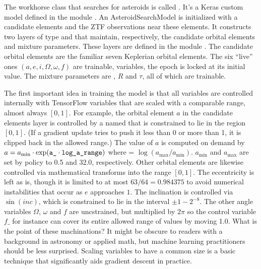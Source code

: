 The workhorse class that searches for asteroids is called .  
It's a Keras custom model defined in the module .
An AsteroidSearchModel is initialized with a candidate elements and the ZTF observations near these elements.
It constructs two layers of type  and  that maintain, respectively, 
the candidate orbital elements and mixture parameters.
These layers are defined in the module .
The candidate orbital elements are the familiar seven Keplerian orbital elements.
The six ``live'' ones $(a, e, i, \Omega, \omega, f)$ are trainable, variables, the epoch is locked at its initial value.
The mixture parameters are , $R$ and $\tau$, all of which are trainable.

The first important idea in training the model is that all variables are controlled internally 
with TensorFlow variables that are scaled with a comparable range, almost always $[0, 1]$.
For example, the orbital element $a$ in the candidate elements layer is controlled by a 
named  that is constrained to lie in the region $[0, 1]$.
(If a gradient update tries to push it less than 0 or more than 1, it is clipped back in the allowed range.)
The value of $a$ is computed on demand by
$a = a_{\mathrm{min}} \cdot \exp( \texttt{a\_} \cdot \texttt{log\_a\_range})$ 
where  = $\log(a_{\mathrm{max}} / a_{\mathrm{min}})$.
$a_{\mathrm{min}}$ and $a_{\mathrm{max}}$ are set by policy to 0.5 and 32.0, respectively.
Other orbital elements are likewise controlled via mathematical transforms into the range $[0, 1]$.
The eccentricity is left as is, though it is limited to at most $63 / 64 = 0.984375$ to avoid numerical instabilities that occur as $e$ approaches $1$.
The inclination is controlled via $\sin(inc)$, which is constrained to lie in the interval $\pm 1 - 2^{-8}$.
The other angle variables $\Omega$, $\omega$ and $f$ are uncstrained, but multiplied by $2 \pi$ 
so the control variable $f\_$ for instance can cover its entire allowed range of values by moving 1.0.
What is the point of these machinations?
It might be obscure to readers with a background in astronomy or applied math, but machine learning practitioners should be less surprised.
Scaling variables to have a common size is a basic technique that significantly aids gradient descent in practice.

